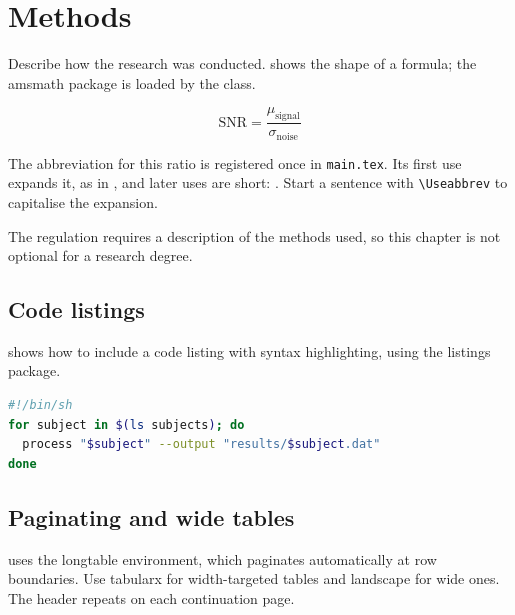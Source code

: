 \chapter{Methods}
Describe how the research was conducted.  shows the shape of a formula; the amsmath package is loaded by the class.

\begin{equation}
  \label{eq:signal-to-noise}
  \mathrm{SNR} = \frac{\mu_{\mathrm{signal}}}{\sigma_{\mathrm{noise}}}
\end{equation}

The abbreviation for this ratio is registered once in \texttt{main.tex}. Its first use expands it, as in , and later uses are short: . Start a sentence with \texttt{\textbackslash Useabbrev} to capitalise the expansion.

The regulation requires a description of the methods used, so this chapter is not optional for a research degree.

\section{Code listings}
 shows how to include a code listing with syntax highlighting, using the listings package.

\begin{lstlisting}[caption={A sample shell command.},label={lst:command},language=bash]
#!/bin/sh
for subject in $(ls subjects); do
  process "$subject" --output "results/$subject.dat"
done
\end{lstlisting}

\section{Paginating and wide tables}
 uses the longtable environment, which paginates automatically at row boundaries. Use tabularx for width-targeted tables and landscape for wide ones. The header repeats on each continuation page.


